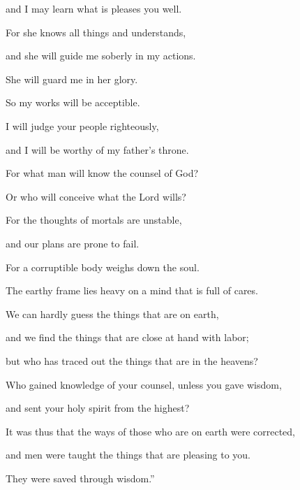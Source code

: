 {\par }{\QB and I may learn what is pleases you well.
\par }{\Q {}For she knows all things and understands,
\par }{\QB and she will guide me soberly in my actions.
\par }{\QB She will guard me in her glory.
\par }{\Q {}So my works will be acceptible.
\par }{\QB I will judge your people righteously,
\par }{\QB and I will be worthy of my father’s
 throne.
\par }{\Q {}For what man will know the counsel of God?
\par }{\QB Or who will conceive what the Lord wills?
\par }{\Q {}For the thoughts of mortals are unstable,
\par }{\QB and our plans are prone to fail.
\par }{\Q {}For a corruptible body weighs down the soul.
\par }{\QB The earthy frame lies heavy on a mind that is full of cares.
\par }{\Q {}We can hardly guess the things that are on earth,
\par }{\QB and we find the things that are close at hand with labor;
\par }{\QB but who has traced out the things that are in the heavens?
\par }{\Q {}Who gained knowledge of your counsel, unless you gave wisdom,
\par }{\QB and sent your holy spirit from the highest?
\par }{\Q {}It was thus that the ways of those who are on earth were corrected,
\par }{\QB and men were taught the things that are pleasing to you.
\par }{\QB They were saved through wisdom.”
\par }{\BB \par }
